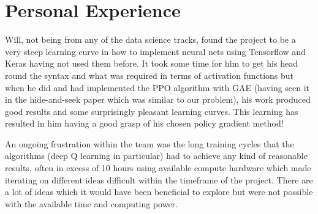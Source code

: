 \documentclass{article}
\begin{document}
\section{Personal Experience} \label{Personal Experience}

Will, not being from any of the data science tracks, found the project to be a very steep learning curve in how to implement neural nets using Tensorflow and Keras having not used them before.
It took some time for him to get his head round the syntax and what was required in terms of activation functions but when he did and had implemented the PPO algorithm with GAE (having seen it in the hide-and-seek paper \citep{emergenttoolusage} which was similar to our problem), his work produced good results and some surprisingly pleasant learning curves. This learning has resulted in him having a good grasp of his chosen policy gradient method!

An ongoing frustration within the team was the long training cycles that the algorithms (deep Q learning in particular) had to achieve any kind of reasonable results, often in excess of 10 hours using available compute hardware which made iterating on different ideas difficult within the timeframe of the project. There are a lot of ideas which it would have been beneficial to explore but were not possible with the available time and computing power.





\end{document}
